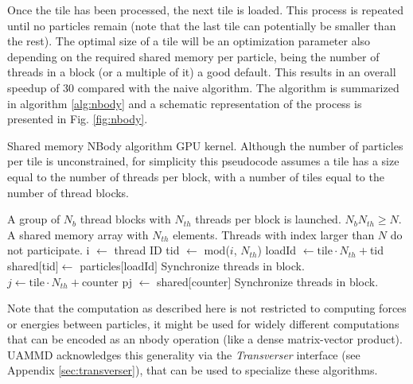 \documentclass[ twoside,openright,titlepage,numbers=noenddot,%
headinclude,footinclude,cleardoublepage=empty,abstract=on,
BCOR=5mm,paper=b5,fontsize=11pt, dvipsnames
]{scrreprt}
\newcommand{\uammd}{\gls{UAMMD}\xspace}
\begin{document}
Once the tile has been processed, the next tile is loaded. This process is repeated until no particles remain (note that the last tile can potentially be smaller than the rest).
The optimal size of a tile will be an optimization parameter also depending on the required shared memory per particle, being the number of threads in a block (or a multiple of it) a good default.
This results in an overall speedup of 30 compared with the naive algorithm.
The algorithm is summarized in algorithm \ref{alg:nbody} and a schematic representation of the process is presented in Fig. \ref{fig:nbody}.
\begin{algorithm}[H]
  \caption{Shared memory NBody algorithm GPU kernel. Although the number of particles per tile is unconstrained, for simplicity this pseudocode assumes a tile has a size equal to the number of threads per block, with a number of tiles equal to the number of thread blocks.} \label{alg:nbody}
  \begin{algorithmic}[1]
    \Require
    \Statex A group of $N_b$ thread blocks with $N_{th}$ threads per block is launched.
    \Statex $N_bN_{th}\ge N$.
    \Statex A shared memory array with $N_{th}$ elements.
    \Ensure
    \Statex Threads with index larger than $N$ do not participate.
    \State i $\gets$ thread ID 
    \State tid $\gets$ mod($i$, $N_{th}$) 
    \State loadId $\gets \text{tile}\cdot N_{th}+$tid
    \State shared$[$tid$]\gets$ particles$[$loadId$]$
    \State Synchronize threads in block. 
    \State $j \gets \text{tile}\cdot N_{th} + \text{counter}$
    \State pj $\gets$ shared$[$counter$]$
    \EndFor
    \State Synchronize threads in block. 
    \EndFor
  \end{algorithmic}
\end{algorithm}

Note that the computation as described here is not restricted to computing forces or energies between particles, it might be used for widely different computations that can be encoded as an nbody operation (like a dense matrix-vector product).
\uammd acknowledges this generality via the \emph{Transverser} interface (see Appendix \ref{sec:transverser}), that can be used to specialize these algorithms.
\end{document}
